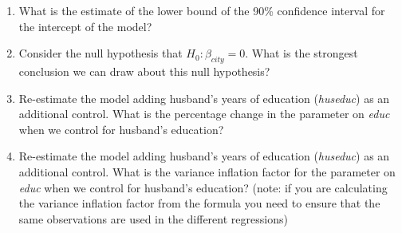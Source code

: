\begin{enumerate}
\item What is the estimate of the lower bound of the 90\% confidence interval for the intercept of the model?

\item Consider the null hypothesis that $H_0:\beta_{city}=0$. What is the strongest conclusion we can draw about this null hypothesis?

\item Re-estimate the model adding husband's years of education (\textit{huseduc}) as an additional control. What is the percentage change in the parameter on \textit{educ} when we control for husband's education?

\item Re-estimate the model adding husband's years of education (\textit{huseduc}) as an additional control. What is the variance inflation factor for the parameter on \textit{educ} when we control for husband's education? (note: if you are calculating the variance inflation factor from the formula you need to ensure that the same observations are used in the different regressions)
\end{enumerate}

